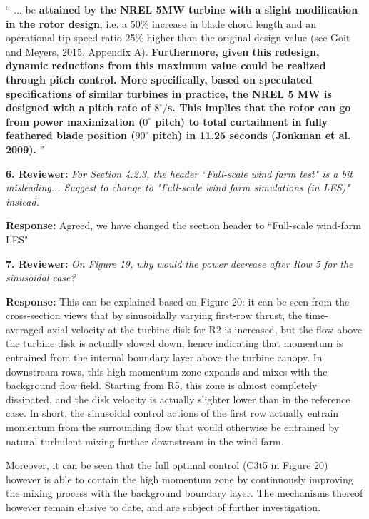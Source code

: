 \documentclass[]{article}
\begin{document}
``
... be \textbf{attained by the NREL 5MW turbine with a slight modification in the rotor design}, i.e. a 50\% increase in blade chord length and an operational tip speed ratio 25\% higher than 
the original design value (see Goit and Meyers, 2015, Appendix A). \textbf{Furthermore, given this redesign, dynamic reductions from this maximum value could be realized through pitch control. More specifically, based on speculated specifications of similar turbines in practice, the NREL 5 MW is designed with a pitch rate of $8^{\circ}/$s. This implies that the rotor can go from power maximization ($0^\circ$ pitch) to total curtailment in fully feathered blade position ($90^\circ$ pitch) in 11.25 seconds (Jonkman et al. 2009).}
'' 


\dotfill

\textbf{6. Reviewer: } \textit{For Section 4.2.3, the header ``Full-scale wind farm test" is a bit misleading... Suggest
	to change to "Full-scale wind farm simulations (in LES)" instead.}

\textbf{Response: } Agreed, we have changed the section header to ``Full-scale wind-farm LES"

\dotfill

\textbf{7. Reviewer: } \textit{On Figure 19, why would the power decrease after Row 5 for the sinusoidal case?}

\textbf{Response: } This can be explained based on Figure 20: it can be seen from the cross-section views that by sinusoidally varying first-row thrust, the time-averaged axial velocity at the turbine disk for R2 is increased, but the flow above the turbine disk is actually slowed down, hence indicating that momentum is entrained from the internal boundary layer above the turbine canopy. In downstream rows, this high momentum zone expands and mixes with the background flow field. Starting from R5, this zone is almost completely dissipated, and the disk velocity is actually slighter lower than in the reference case. In short, the sinusoidal control actions of the first row actually entrain momentum from the surrounding flow that would otherwise be entrained by natural turbulent mixing further downstream in the wind farm. 

Moreover, it can be seen that the full optimal control (C3t5 in Figure 20) however is able to contain the high momentum zone by continuously improving the mixing process with the background boundary layer. The mechanisms thereof however remain elusive to date, and are subject of further investigation. 
\end{document}
